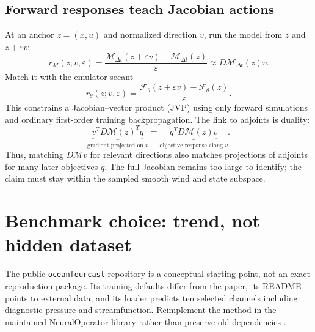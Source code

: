 \documentclass[11pt]{article}
\begin{document}
\subsection{Forward responses teach Jacobian actions}
At an anchor \(z=(x,u)\) and normalized direction \(v\), run the model from \(z\) and
\(z+\varepsilon v\):
\[
r_M(z;v,\varepsilon)=
\frac{\mathcal{M}_{\Delta t}(z+\varepsilon v)-\mathcal{M}_{\Delta t}(z)}
{\varepsilon}\approx D\mathcal{M}_{\Delta t}(z)v .
\]
Match it with the emulator secant
\[
r_\theta(z;v,\varepsilon)=
\frac{\mathcal{F}_{\theta}(z+\varepsilon v)-\mathcal{F}_{\theta}(z)}
{\varepsilon}.
\]
This constrains a Jacobian--vector product (JVP) using only forward simulations and
ordinary first-order training backpropagation. The link to adjoints is duality:
\[
\underbrace{v^TD\mathcal{M}(z)^Tq}_{\text{gradient projected on }v}
=\underbrace{q^TD\mathcal{M}(z)v}_{\text{objective response along }v}.
\]
Thus, matching \(D\mathcal{M}v\) for relevant directions also matches projections of
adjoints for many later objectives \(q\). The full Jacobian remains too large to identify;
the claim must stay within the sampled smooth wind and state subspace.

\section{Benchmark choice: trend, not hidden dataset}
The public \texttt{oceanfourcast} repository is a conceptual starting point, not an exact
reproduction package. Its training defaults differ from the paper, its README points to
external data, and its loader predicts ten selected channels including diagnostic
pressure and streamfunction. Reimplement the method in the maintained NeuralOperator
library rather than preserve old dependencies \cite{OceanFourCast,NeuralOperator}.
\end{document}
